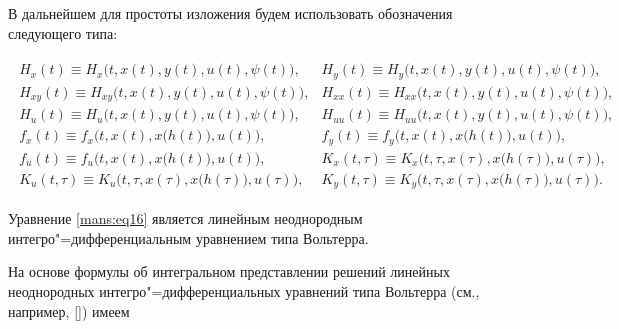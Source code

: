 В дальнейшем для простоты изложения будем использовать обозначения следующего типа:

\begin{gather*}

\begin{array}{ll}

  H_{x}(t)\equiv H_{x}\bigl(t, x(t), y(t), u(t), \psi (t)\bigr),  

& H_{y}(t)\equiv H_{y}\bigl(t, x(t), y(t), u(t), \psi (t)\bigr), \\

 H_{xy}(t)\equiv H_{xy}\bigl(t, x(t), y(t), u(t), \psi (t)\bigr), & 

 H_{xx}(t)\equiv H_{xx}\bigl(t, x(t), y(t), u(t), \psi (t)\bigr), \\

 H_{u}(t)\equiv H_{u}\bigl(t, x(t), y(t), u(t), \psi (t)\bigr),  &  

H_{uu}(t)\equiv H_{uu}\bigl(t, x(t), y(t), u(t), \psi (t)\bigr), \\

f_{x}(t)\equiv f_{x}\bigl(t, x(t), x\bigl(h(t)\bigr), u(t)\bigr),  &  

f_{y}(t)\equiv f_{y}\bigl(t, x(t), x\bigl(h(t)\bigr), u(t)\bigr), \\

f_{u}(t)\equiv f_{u}\bigl(t, x(t), x\bigl(h(t)\bigr), u(t)\bigr),  &  

K_{x}(t, \tau)\equiv K_{x}\bigl(t, \tau, x(\tau), x\bigl(h(\tau)\bigr), u(\tau)\bigr), \\

K_{u}(t, \tau)\equiv K_{u}\bigl(t, \tau, x(\tau), x\bigl(h(\tau)\bigr), u(\tau)\bigr),  &  

K_{y}(t, \tau)\equiv K_{y}\bigl(t, \tau, x(\tau), x\bigl(h(\tau)\bigr), u(\tau)\bigr).

\end{array}

\end{gather*}







Уравнение \eqref{mans:eq16} является линейным неоднородным интегро"=дифференциальным уравнением типа Вольтерра. 

На основе формулы об интегральном представлении решений линейных неоднородных интегро"=дифференциальных уравнений типа Вольтерра (см., например, []) имеем

